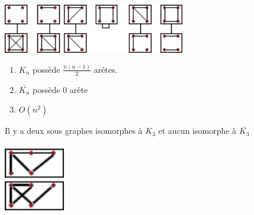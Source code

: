 \\
\\
\includegraphics[width=300px]{Images/fig21.pdf}
\\
\begin{enumerate}
	\item $K_n$ possède $\frac{n(n-1)}{2}$ arêtes.
	\item $\bar{K_n}$ possède 0 arête
	\item $O(n^2)$
\end{enumerate}

 Il y a deux sous graphes isomorphes à $K_3$ et aucun isomorphe à $\bar{K_3}$
\newpage
{} \\
\\
\includegraphics[width=100px]{Images/fig23.pdf}
\\

